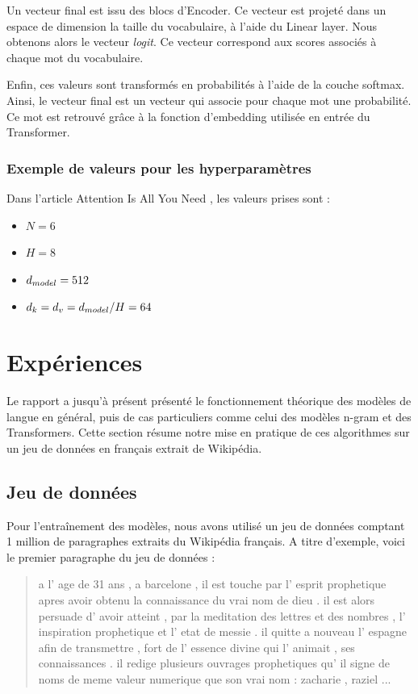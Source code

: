 Un vecteur final est issu des blocs d'Encoder. Ce vecteur est projeté dans un espace de dimension la taille du vocabulaire,
à l'aide du Linear layer. Nous obtenons alors le vecteur \textit{logit}. Ce vecteur correspond aux scores associés
à chaque mot du vocabulaire.

Enfin, ces valeurs sont transformés en probabilités à l'aide de la couche softmax. Ainsi, le vecteur final est un
vecteur qui associe pour chaque mot une probabilité. Ce mot est retrouvé grâce à la fonction d'embedding
utilisée en entrée du Transformer.


\subsubsection{Exemple de valeurs pour les hyperparamètres}

Dans l'article \og Attention Is All You Need \fg{} \cite{vaswani2017attention}, les valeurs prises sont :

\begin{itemize}
  \item $N=6$
  \item $H=8$
  \item $d_{model} = 512$
  \item $d_k = d_v = d_{model}/H = 64$
\end{itemize}


\hypertarget{expuxe9riences}{%
\section{Expériences}\label{expuxe9riences}}

Le rapport a jusqu'à présent présenté le fonctionnement théorique des
modèles de langue en général, puis de cas particuliers comme celui des
modèles n-gram et des Transformers. Cette section résume notre mise en
pratique de ces algorithmes sur un jeu de données en français extrait de
Wikipédia.

\hypertarget{jeu-de-donnuxe9es}{%
\subsection{Jeu de données}\label{jeu-de-donnuxe9es}}

Pour l'entraînement des modèles, nous avons utilisé un jeu de données
comptant 1 million de paragraphes extraits du Wikipédia français. A
titre d'exemple, voici le premier paragraphe du jeu de données :

\begin{quotation}
a l' age de 31 ans , a barcelone , il est touche par l' esprit prophetique apres avoir obtenu la connaissance du vrai nom de dieu . il est alors persuade d' avoir atteint , par la meditation des lettres et des nombres , l' inspiration prophetique et l' etat de messie . il quitte a nouveau l' espagne afin de transmettre , fort de l' essence divine qui l' animait , ses connaissances . il redige plusieurs ouvrages prophetiques qu' il signe de noms de meme valeur numerique que son vrai nom : zacharie , raziel ...
\end{quotation}

